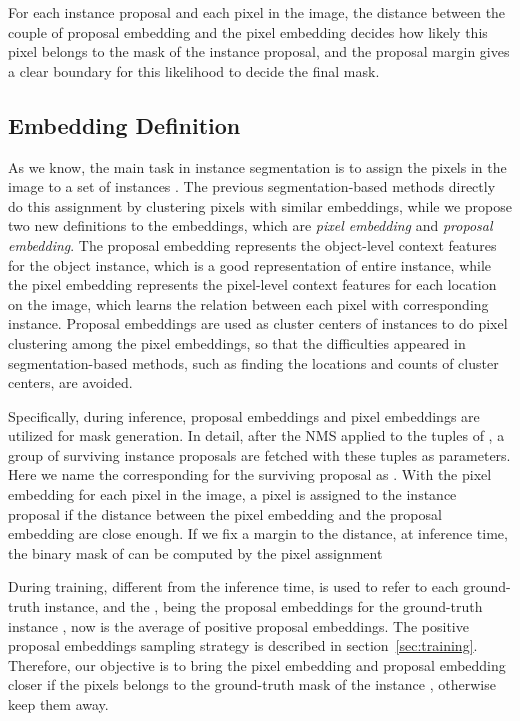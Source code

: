 \documentclass[10pt,twocolumn,letterpaper]{article}
\begin{document}
For each instance proposal and each pixel in the image, the distance between the couple of proposal embedding and the pixel embedding decides how likely this pixel belongs to the mask of the instance proposal, and the proposal margin gives a clear boundary for this likelihood to decide the final mask.

\subsection{Embedding Definition} \label{sec:embed_def}

As we know, the main task in instance segmentation is to assign  the pixels  in the image to a set of instances . 
The previous segmentation-based methods directly do this assignment by clustering pixels with similar embeddings, while we propose two new definitions to the embeddings, which are \emph{pixel embedding} and \emph{proposal embedding}. 
The proposal embedding represents the object-level context features for the object instance, which is a good representation of entire instance, while the pixel embedding represents the pixel-level context features for each location on the image, which learns the relation between each pixel with corresponding instance.
Proposal embeddings are used as cluster centers of instances to do pixel clustering among the pixel embeddings, so that the difficulties appeared in segmentation-based methods, such as finding the locations and counts of cluster centers, are avoided. 

Specifically, during inference, proposal embeddings and pixel embeddings are utilized for mask generation. 
In detail, after the NMS applied to the tuples of , a group of surviving instance proposals  are fetched with these tuples as parameters. 
Here we name the corresponding  for the surviving proposal  as .
With the pixel embedding  for each pixel  in the image, a pixel  is assigned to the instance proposal  if the distance between the pixel embedding  and the proposal embedding  are close enough. 
If we fix a margin  to the distance, at inference time, the binary mask of  can be computed by the pixel assignment



During training, different from the inference time,  is used to refer to each ground-truth instance, and the , being the proposal embeddings for the ground-truth instance , now is the average of positive proposal embeddings. 
The positive proposal embeddings sampling strategy is described in section~\ref{sec:training}. 
Therefore, our objective is to bring the pixel embedding  and proposal embedding  closer if the pixels  belongs to the ground-truth mask of the instance , otherwise keep them away. 
\end{document}
